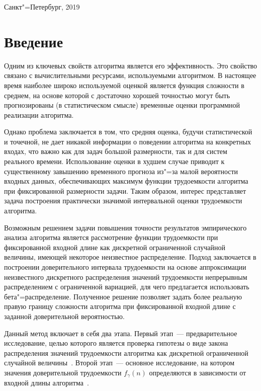 \documentclass[a4paper,fontsize=14pt]{article}
\begin{document}
\begin{center} Санкт"=Петербург, 2019 \end{center}
\thispagestyle{empty} %


\newpage

\tableofcontents

\newpage

\section{Введение} \label{sec:introduction}

Одним из ключевых свойств алгоритма является его эффективность. Это свойство связано с вычислительными ресурсами, используемыми алгоритмом. В настоящее время наиболее широко используемой оценкой является функция сложности в среднем, на основе которой с достаточно хорошей точностью могут быть прогнозированы (в статистическом смысле) временные оценки программной реализации алгоритма.

Однако проблема заключается в том, что средняя оценка, будучи статистической и точечной, не дает никакой информации о поведении алгоритма на конкретных входах, что важно как для задач большой размерности, так и для систем реального времени. Использование оценки в худшем случае приводит к существенному завышению временного прогноза из"=за малой вероятности входных данных, обеспечивающих максимум функции трудоемкости алгоритма при фиксированной размерности задачи. Таким образом, интерес представляет задача построения практически значимой интервальной оценки трудоемкости алгоритма.

Возможным решением задачи повышения точности результатов эмпирического анализа алгоритма является рассмотрение функции трудоемкости при фиксированной входной длине как дискретной ограниченной случайной величины, имеющей некоторое неизвестное распределение. Подход заключается в построении доверительного интервала трудоемкости на основе аппроксимации неизвестного дискретного распределения значений трудоемкости непрерывным распределением с ограниченной вариацией, для чего предлагается использовать бета"=распределение. Полученное решение позволяет задать более реальную правую границу сложности алгоритма при фиксированной входной длине с заданной доверительной вероятностью.

Данный метод включает в себя два этапа. Первый этап~--- предварительное исследование, целью которого является проверка гипотезы о виде закона распределения значений трудоемкости алгоритма как дискретной ограниченной случайной величины~\cite{petrushyn_ulyanov_planning}. Второй этап~--- основное исследование, на котором значения доверительной трудоемкости $f_\gamma(n)$ определяются в зависимости от входной длины алгоритма~\cite{petrushyn_ulyanov_analysis}.
\end{document}
